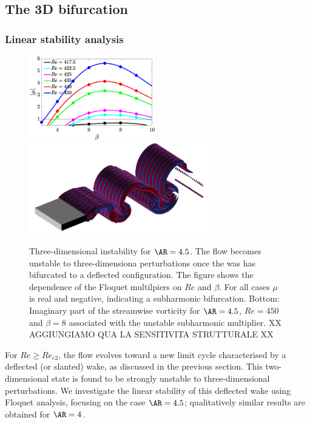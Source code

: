 \subsection{The 3D bifurcation}

\subsubsection{Linear stability analysis}

\begin{figure}
  \centering
  \includegraphics[width=0.49\textwidth]{./fig/AR4p5/multipliers_3D.eps}
  \includegraphics[trim={0 0 0 0},clip,width=0.7\textwidth]{./fig/AR4p5/Floqetmode_beta_8_Re450_AR4p5.png}  
  \caption{Three-dimensional instability for $\AR=4.5$. The flow becomes unstable to three-dimensiona perturbations once the was has bifurcated to a deflected configuration. The figure shows the dependence of the Floquet multilpiers on $Re$ and $\beta$. For all cases $\mu$ is real and negative, indicating a subharmonic bifurcation. Bottom: Imaginary part of the streamwise vorticity for $\AR=4.5$, $Re=450$ and $\beta=8$ associated with the unstable subharmonic multiplier. XX AGGIUNGIAMO QUA LA SENSITIVITA STRUTTURALE XX}
  \label{fig:mul-3d-ar4p5}
\end{figure}

For $Re \ge Re_{c2}$, the flow evolves toward a new limit cycle characterised by a deflected (or slanted) wake, as discussed in the previous section. This two-dimensional state is found to be strongly unstable to three-dimensional perturbations. We investigate the linear stability of this deflected wake using Floquet analysis, focusing on the case $\AR=4.5$; qualitatively similar results are obtained for $\AR=4$.

